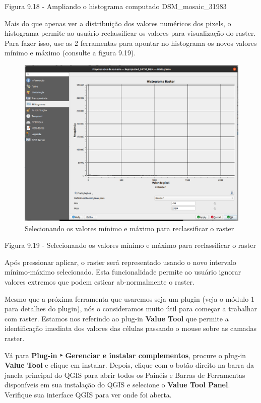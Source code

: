 \documentclass[
]{book}
\begin{document}
Figura 9.18 - Ampliando o histograma computado DSM\_mosaic\_31983

Mais do que apenas ver a distribuição dos valores numéricos dos pixels, o histograma permite ao usuário reclassificar os valores para visualização do raster. Para fazer isso, use as 2 ferramentas para apontar no histograma os novos valores mínimo e máximo (consulte a figura 9.19).

\begin{figure}
\centering
\includegraphics{media/modulo9/fig919.png}
\caption{Selecionando os valores mínimo e máximo para reclassificar o raster}
\end{figure}

Figura 9.19 - Selecionando os valores mínimo e máximo para reclassificar o raster

Após pressionar aplicar, o raster será representado usando o novo intervalo mínimo-máximo selecionado. Esta funcionalidade permite ao usuário ignorar valores extremos que podem esticar ab-normalmente o raster.

Mesmo que a próxima ferramenta que usaremos seja um plugin (veja o módulo 1 para detalhes do plugin), nós o consideramos muito útil para começar a trabalhar com raster. Estamos nos referindo ao plug-in \textbf{Value Tool} que permite a identificação imediata dos valores das células passando o mouse sobre as camadas raster.

Vá para \textbf{Plug-in ‣ Gerenciar e instalar complementos}, procure o plug-in \textbf{Value Tool} e clique em instalar. Depois, clique com o botão direito na barra da janela principal do QGIS para abrir todos os Painéis e Barras de Ferramentas disponíveis em sua instalação do QGIS e selecione o \textbf{Value Tool Panel}. Verifique sua interface QGIS para ver onde foi aberta.
\end{document}
